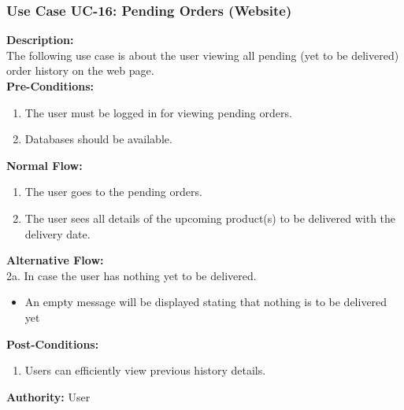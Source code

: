 \subsubsection{Use Case UC-16: Pending Orders (Website) }
\textbf{Description:}\\
The following use case is about the user viewing all pending (yet to be delivered) order history on the web page.
\\
\textbf{Pre-Conditions:}
\begin{enumerate}
    \item The user must be logged in for viewing pending orders.
\item Databases should be available.
\end{enumerate}
\textbf{Normal Flow:}\\
\begin{enumerate}
\item The user goes to the pending orders. 
\item The user sees all details of the upcoming product(s) to be delivered with the delivery date. \end{enumerate}
\textbf{Alternative Flow:}\\
2a. In case the user has nothing yet to be delivered. \begin{itemize}
    \item An empty message will be displayed stating that nothing is to be delivered yet
\end{itemize}
\textbf{Post-Conditions: }
\begin{enumerate}
\item	Users can efficiently view previous history details.
\end{enumerate}
\textbf{Authority:}
User
 
